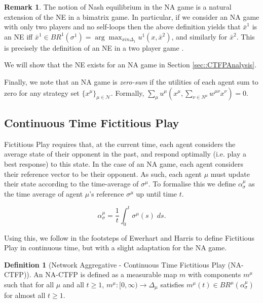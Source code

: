 \documentclass{article}
\theoremstyle{definition}
\newtheorem{definition}{Definition}
\newtheorem*{remark}{Remark}
\newcommand{\agentset}{\mathcal{N}}
\newcommand{\wmunu}{w^{\mu \nu}}
\newcommand{\xmu}{x^{\mu}}
\newcommand{\xnu}{x^{\nu}}
\newcommand{\refmu}{\sigma^{\mu}}
\newcommand{\avgref}[1]{\alpha_\sigma^{#1}}
\newcommand{\NE}[1]{\bar{x}^{#1}}
\newcommand{\weightedsum}{ \sum_{\nu \in N^\mu} \wmunu \xnu}
\begin{document}
\begin{remark}
	The notion of Nash equilibrium in the NA game is a natural
	extension of the NE in a bimatrix game.
	In particular, if we consider an NA game with only two players and no
	self-loops then the above definition yields that $ \NE{1}$ is an NE iff
	$     \NE{1} \in BR^1 (\sigma^1) = \arg \max_{x in \Delta_1} u^1 (x, \NE{2})$,
	and similarly for $\NE{2}$. This is precisely the definition of an NE in a two player game \cite{}.
\end{remark}

We will show that the NE exists for an NA game in Section \ref{sec::CTFPAnalysis}. 

Finally, we note that an NA game is \emph{zero-sum} if the utilities of each agent sum to zero for any strategy set $\{ \xmu \}_{\mu \in \agentset}$. Formally,
%
$\sum_\mu u^\mu(\xmu, \weightedsum) = 0$.

\subsection{Continuous Time Fictitious Play}
\label{sec::CTFP}

  Fictitious Play requires that, at the current time, each agent
  considers the average state of their opponent in the past, and
  respond optimally (i.e. play a best response) to this state. In the
  case of an NA game, each agent considers their reference vector to
  be their opponent. As such, each agent $\mu$ must update their state
  according to the time-average of $\refmu$. To formalise this we
  define $\avgref{\mu}$ as the time average of agent $\mu$'s reference
  $\refmu$ up until time $t$.

  \begin{equation}
    \avgref{\mu} = \frac{1}{t} \int_0^t \refmu(s) \; ds.
  \end{equation}

  Using this, we follow in the footsteps of Ewerhart \cite{Ostrovski2014} and Harris \cite{Harris1998} to define
  Fictitious Play in continuous time, but with a slight adaptation for the NA game.
%
  \begin{definition}[Network Aggregative - Continuous Time Fictitious Play (NA-CTFP)]
    An NA-CTFP is defined as a measurable map $m$ with components $m^\mu$ such that for all $\mu$
    and all $t \geq 1$, $m^\mu: [0, \infty) \rightarrow \Delta_\mu$ satisfies $m^\mu(t) \in
    BR^\mu(\alpha_{\sigma}^\mu)$ for almost all $t \geq 1$.
  \end{definition}
\end{document}
